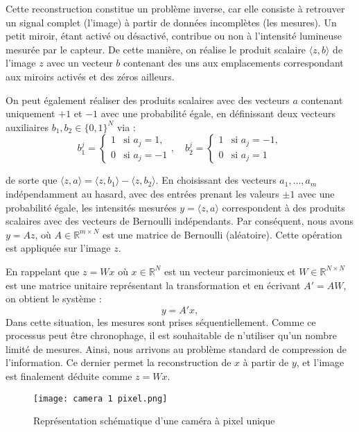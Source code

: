 \documentclass[a4paper, 12pt]{report} %
\begin{document}
Cette reconstruction constitue un problème inverse, car elle consiste à retrouver un signal complet (l'image) à partir de données incomplètes (les mesures). Un petit miroir, étant activé ou désactivé, contribue ou non à l'intensité lumineuse mesurée par le capteur. De cette manière, on réalise le produit scalaire \( \langle z, b \rangle \) de l'image \( z \) avec un vecteur \( b \) contenant des uns aux emplacements correspondant aux miroirs activés et des zéros ailleurs.

On peut également réaliser des produits scalaires avec des vecteurs \( a \) contenant uniquement \( +1 \) et \( -1 \) avec une probabilité égale, en définissant deux vecteurs auxiliaires \( b_1, b_2 \in \{0,1\}^N \) via :
\[
b_1^j = 
\begin{cases} 
1 & \text{si } a_j = 1, \\
0 & \text{si } a_j = -1 
\end{cases}, \quad
b_2^j = 
\begin{cases} 
1 & \text{si } a_j = -1, \\
0 & \text{si } a_j = 1 
\end{cases}
\]

de sorte que \( \langle z, a \rangle = \langle z, b_1 \rangle - \langle z, b_2 \rangle \). En choisissant des vecteurs \( a_1, \ldots, a_m \) indépendamment au hasard, avec des entrées prenant les valeurs \( \pm 1 \) avec une probabilité égale, les intensités mesurées \( y = \langle z, a \rangle \) correspondent à des produits scalaires avec des vecteurs de Bernoulli indépendants. Par conséquent, nous avons \( y = Az \), où \( A \in \mathbb{R}^{m \times N} \) est une matrice de Bernoulli (aléatoire). Cette opération est appliquée sur l'image \( z \).


En rappelant que \( z = Wx \) où \( x \in \mathbb{R}^N \) est un vecteur parcimonieux  et \( W \in \mathbb{R}^{N \times N} \) est une matrice unitaire représentant la transformation 
et en écrivant \( A' = AW \), on obtient le système :
\[
y = A'x,
\]
 Dans cette situation, les mesures sont prises séquentiellement. Comme ce processus peut être chronophage, il est souhaitable de n'utiliser qu'un nombre limité de mesures. Ainsi, nous arrivons au problème standard de compression de l'information. Ce dernier permet la reconstruction de \( x \) à partir de \( y \), et l'image est finalement déduite comme \( z = Wx \).


\begin{figure}[H] %
    \centering
    \texttt{[image: camera 1 pixel.png]}
    \caption{Représentation schématique d'une caméra à pixel unique  \cite{rice_single_pixel_camera}}
    \label{fig:mon_label}
\end{figure}
\end{document}
